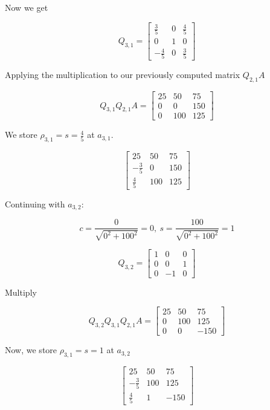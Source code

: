 Now we get 

\[
    Q_{3,1} = 
    \begin{bmatrix}
        \frac{3}{5} & 0 & \frac{4}{5} \\
        0 & 1 & 0 \\
        -\frac{4}{5} & 0 & \frac{3}{5}
    \end{bmatrix}
\]

Applying the multiplication to our previously computed matrix \(Q_{2,1}A\)

\[
    Q_{3,1}Q_{2,1}A = 
    \begin{bmatrix}
        25 & 50 & 75 \\ 
        0 & 0 & 150 \\ 
        0 & 100 & 125
    \end{bmatrix}
\]

We store \(\rho_{3,1} = s = \frac{4}{5}\) at \(a_{3,1}\). 

\[
    \begin{bmatrix}
        25 & 50 & 75 \\ 
        -\frac{3}{5} & 0 & 150 \\ 
        \frac{4}{5} & 100 & 125
    \end{bmatrix}
\]

Continuing with \(a_{3, 2}\):

\[
    c = \frac{0}{\sqrt{0^2 + 100^2}} = 0, \ 
    s = \frac{100}{\sqrt{0^2 + 100^2}} = 1 
\]

\[
    Q_{3,2} = 
    \begin{bmatrix}
        1 & 0 & 0 \\
        0 & 0 & 1 \\
        0 & -1 & 0
    \end{bmatrix}
\]

Multiply 

\[
    Q_{3,2}Q_{3,1}Q_{2,1}A =
    \begin{bmatrix}
        25 & 50 & 75 \\ 
        0 & 100 & 125 \\ 
        0 & 0 & -150
    \end{bmatrix}
\]

Now, we store \(\rho_{3,1} = s = 1\) at \(a_{3,2}\)

\[
    \begin{bmatrix}
        25 & 50 & 75 \\ 
        -\frac{3}{5} & 100 & 125 \\ 
        \frac{4}{5} & 1 & -150
    \end{bmatrix}
\]

